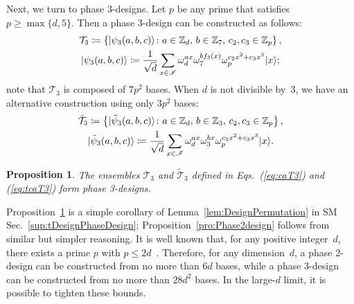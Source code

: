 \documentclass[aps,pra,twocolumn,nofootinbib,superscriptaddress,10pt]{revtex4-2}
\newtheorem{proposition}{Proposition}
\DeclarePairedDelimiter{\ket}{\lvert}{\rangle}
\newcommand{\bbZ}{\mathbb{Z}}
\newcommand{\caT}{\mathcal{T}}
\newcommand{\scrI}{\mathscr{I}}
\newcommand{\tcaT}{\tilde{\mathcal{T}}}
\newcommand{\tpsi}{\tilde{\psi}}
\newcommand{\eqsref}[2]{Eqs.~(\ref{#1}) and (\ref{#2})}
\newcommand{\lref}[1]{Lemma~\ref{#1}}
\newcommand{\pref}[1]{Proposition~\ref{#1}}
\newcommand{\Pref}[1]{Proposition~\ref{#1}}
\newcommand{\sref}[1]{Sec.~\ref{#1}}
\begin{document}
Next, we turn to phase 3-designs. Let $p$ be any prime that satisfies $p\geq\max\{d,5\}$. Then a phase 3-design can be constructed as follows:
\begin{equation}\label{eq:caT3}
	\begin{gathered}
		\caT_3\coloneqq\left\{\ket{\psi_3(a,b,c)} \colon a\in \bbZ_d,\, b\in \bbZ_7,\, c_2, c_3\in \bbZ_p\right\},\\
		\ket{\psi_3(a,b,c)}\coloneqq\frac{1}{\sqrt{d}} \sum_{x\in \scrI} \omega_d^{ax}\omega_7^{bf_3(x)}\omega_p^{c_2x^2+c_3x^3}\ket{x};
	\end{gathered}
\end{equation}
note that $\caT_3$ is composed of $7p^2$ bases. When $d$ is not divisible by~$3$, we have an alternative construction using only $3p^2$ bases:
\begin{equation}\label{eq:tcaT3}
	\begin{gathered}
		\tcaT_3\coloneqq\left\{\ket{\tpsi_3(a,b,c)} \colon a\in \bbZ_d,\, b\in \bbZ_3,\, c_2, c_3\in \bbZ_p\right\},\\
		\ket{\tpsi_3(a,b,c)}\coloneqq\frac{1}{\sqrt{d}} \sum_{x\in \scrI} \omega_d^{ax}\omega_3^{bx}\omega_p^{c_2x^2+c_3x^3}\ket{x}.
	\end{gathered}
\end{equation}
\begin{proposition}\label{pro:Phase3design}
	The ensembles $\caT_3$ and $\tcaT_3$ defined in \eqsref{eq:caT3}{eq:tcaT3} form phase 3-designs.
\end{proposition}

\Pref{pro:Phase3design} is a simple corollary of \lref{lem:DesignPermutation} in SM \sref{sup:tDesignPhaseDesign}; \pref{pro:Phase2design} follows from similar but simpler reasoning. It is well known that, for any positive integer~$d$, there exists a prime $p$ with $p\leq 2d$~\cite{Ha08}. Therefore, for any dimension~$d$, a phase 2-design can be constructed from no more than $6d$ bases, while a phase 3-design can be constructed from no more than $28d^2$ bases. In the large-$d$ limit, it is possible to tighten these bounds.
\end{document}
